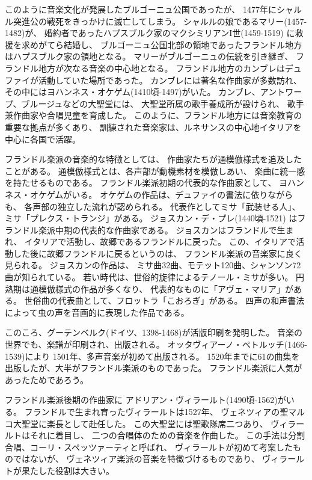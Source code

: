 \documentclass[a4j]{jarticle}
\begin{document}
このように音楽文化が発展したブルゴーニュ公国であったが、
1477年にシャルル突進公の戦死をきっかけに滅亡してしまう。
シャルルの娘であるマリー(1457-1482)が、
婚約者であったハプスブルク家のマクシミリアンI世(1459-1519)
に救援を求めがてら結婚し、
ブルゴーニュ公国北部の領地であったフランドル地方はハプスブルク家の領地となる。
マリーがブルゴーニュの伝統を引き継ぎ、
フランドル地方が次なる音楽の中心地となる。
フランドル地方のカンブレはデュファイが活動していた場所であった。
カンブレには著名な作曲家が多数訪れ、
その中にはヨハンネス・オケゲム(1410頃-1497)がいた。
カンブレ、アントワープ、ブルージュなどの大聖堂には、
大聖堂所属の歌手養成所が設けられ、
歌手兼作曲家や合唱児童を育成した。
このように、フランドル地方には音楽教育の重要な拠点が多くあり、
訓練された音楽家は、ルネサンスの中心地イタリアを中心に各国で活躍。

フランドル楽派の音楽的な特徴としては、
作曲家たちが通模倣様式を追及したことがある。
通模倣様式とは、各声部が動機素材を模倣しあい、
楽曲に統一感を持たせるものである。
フランドル楽派初期の代表的な作曲家として、
ヨハンネス・オケゲムがいる。
オケゲムの作品は、デュファイの書法に依りながらも、
各声部の独立した流れが認められる。
代表作としてミサ「武装せる人」、
ミサ「プレクス・トランジ」がある。
ジョスカン・デ・プレ(1440頃-1521)
はフランドル楽派中期の代表的な作曲家である。
ジョスカンはフランドルで生まれ、
イタリアで活動し、故郷であるフランドルに戻った。
この、イタリアで活動した後に故郷フランドルに戻るというのは、
フランドル楽派の音楽家に良く見られる。
ジョスカンの作品は、
ミサ曲32曲、モテット120曲、シャンソン72曲が知られている。
若い時代は、世俗的旋律によるテノール・ミサが多い。
円熟期は通模倣様式の作品が多くなり、
代表的なものに「アヴェ・マリア」がある。
世俗曲の代表曲として、フロットラ「こおろぎ」がある。
四声の和声書法によって虫の声を音画的に表現した作品である。

このころ、グーテンベルク(ドイツ、1398-1468)が活版印刷を発明した。
音楽の世界でも、楽譜が印刷され、出版される。
オッタヴィアーノ・ペトルッチ(1466-1539)により
1501年、多声音楽が初めて出版される。
1520年までに61の曲集を出版したが、大半がフランドル楽派のものであった。
フランドル楽派に人気があったためであろう。

フランドル楽派後期の作曲家に
アドリアン・ヴィラールト(1490頃-1562)がいる。
フランドルで生まれ育ったヴィラールトは1527年、
ヴェネツィアの聖マルコ大聖堂に楽長として赴任した。
この大聖堂には聖歌隊席二つあり、
ヴィラールトはそれに着目し、
二つの合唱体のための音楽を作曲した。
この手法は分割合唱、コーリ・スペッツァーティと呼ばれ、
ヴィラールトが初めて考案したものではないが、
ヴェネツィア楽派の音楽を特徴づけるものであり、
ヴィラールトが果たした役割は大きい。
\end{document}

